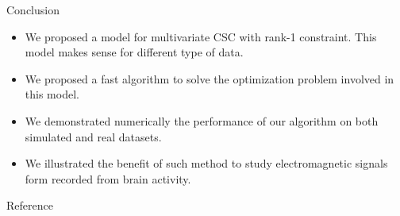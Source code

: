 \documentclass{beamer}
\begin{document}
\begin{frame}{Conclusion}
	\begin{itemize}\itemsep1.5em
		\item We proposed a model for multivariate CSC with rank-1 constraint. This model makes sense for different type of data.
		\item We proposed a fast algorithm to solve the optimization problem involved in this model.
		\item We demonstrated numerically the performance of our algorithm on both simulated and real datasets.
		\item We illustrated the benefit of such method to study electromagnetic signals form recorded from brain activity. 
	\end{itemize}

\end{frame}




\appendix



\begin{frame}[noframenumbering]{Reference}
\tiny

\end{frame}
\end{document}
